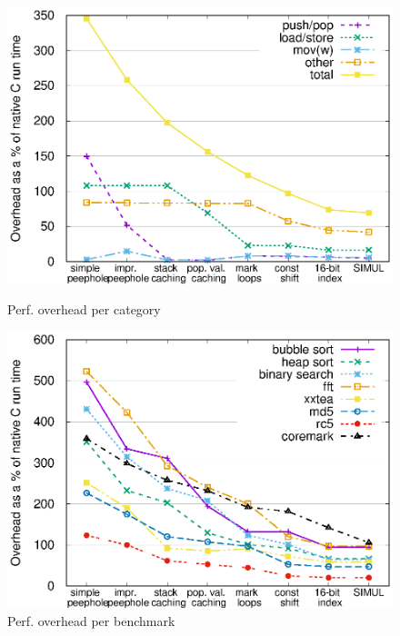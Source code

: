 \begin{figure}
 \centering
 \begin{minipage}{0.45\textwidth}
  \centering
  \includegraphics[width=\myfiguresizeperformance]{performance-per-opcode-category.eps}
  \caption{Perf. overhead per category}
  \label{fig-performance-per-opcode-category}
 \end{minipage}\hfill
 \begin{minipage}{0.45\textwidth}
  \centering
  \includegraphics[width=\myfiguresizeperformance]{performance-per-benchmark.eps}
  \caption{Perf. overhead per benchmark}
  \label{fig-performance-per-benchmark}
 \end{minipage}
\end{figure}

